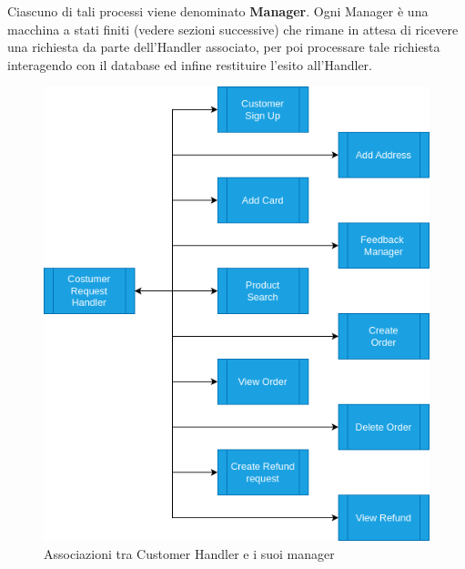 \documentclass[12pt]{report}
\begin{document}
    \newpage
    
    Ciascuno di tali processi viene denominato \textbf{Manager}. Ogni Manager è una macchina a stati finiti (vedere sezioni successive) che rimane in attesa di ricevere una richiesta da parte dell'Handler associato, per poi processare tale richiesta interagendo con il database ed infine restituire l'esito all'Handler.
    
    \begin{figure}[H]
        \centering
        \includegraphics[scale=0.6]{images/System Architecture 1.png}
        \caption{Associazioni tra Customer Handler e i suoi manager}
        \label{fig:Manager_architecture_1}
    \end{figure}
    
\end{document}

